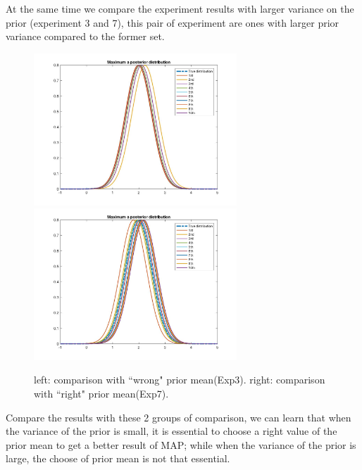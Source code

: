 \documentclass[a4paper]{article}
\begin{document}
\begin{spacing}{2.0}
\begin{itemize}
At the same time we compare the experiment results with larger variance on the prior (experiment 3 and 7), this pair of experiment are ones with larger prior variance compared to the former set.
\begin{figure}[H]
	\centering
	\includegraphics[width=3in]{MAP3.jpg}
	\includegraphics[width=3in]{MAP7.jpg}
	\caption{left: comparison with ``wrong" prior mean(Exp3). right: comparison with ``right" prior mean(Exp7).}
	\label{fig:side:b}
\end{figure}
Compare the results with these 2 groups of comparison, we can learn that when the variance of the prior is small, it is essential to choose a right value of the prior mean to get a better result of MAP; while when the  variance of the prior is large, the choose of prior mean is not that essential.


\end{itemize}
\end{spacing}
\end{document}

